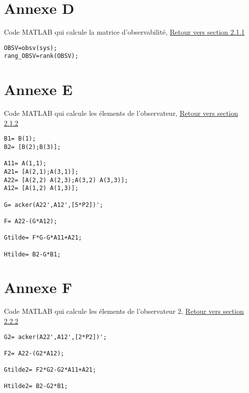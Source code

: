 \chapter*{Annexe D}
	
	Code MATLAB qui calcule la matrice d'observabilité,\label{Annexe D} \hyperref[OBSV]{Retour vers section 2.1.1}
	
	\begin{lstlisting}	
OBSV=obsv(sys);
rang_OBSV=rank(OBSV);
	\end{lstlisting}		
	
	
	\chapter*{Annexe E}
	
	Code MATLAB qui calcule les élements de l'observateur,\label{Annexe E} \hyperref[calobs]{Retour vers section 2.1.2}
	
	\begin{lstlisting}	
B1= B(1);
B2= [B(2);B(3)];

A11= A(1,1);
A21= [A(2,1);A(3,1)];
A22= [A(2,2) A(2,3);A(3,2) A(3,3)]; 
A12= [A(1,2) A(1,3)];   

G= acker(A22',A12',[5*P2])';

F= A22-(G*A12);

Gtilde= F*G-G*A11+A21;
   
Htilde= B2-G*B1;
	\end{lstlisting}	


\chapter*{Annexe F}
	
	Code MATLAB qui calcule les élements de l'observateur 2,\label{Annexe F} \hyperref[calobs2]{Retour vers section 2.2.2}
	
	\begin{lstlisting}
G2= acker(A22',A12',[2*P2])';

F2= A22-(G2*A12);

Gtilde2= F2*G2-G2*A11+A21;
   
Htilde2= B2-G2*B1;
	\end{lstlisting}	
